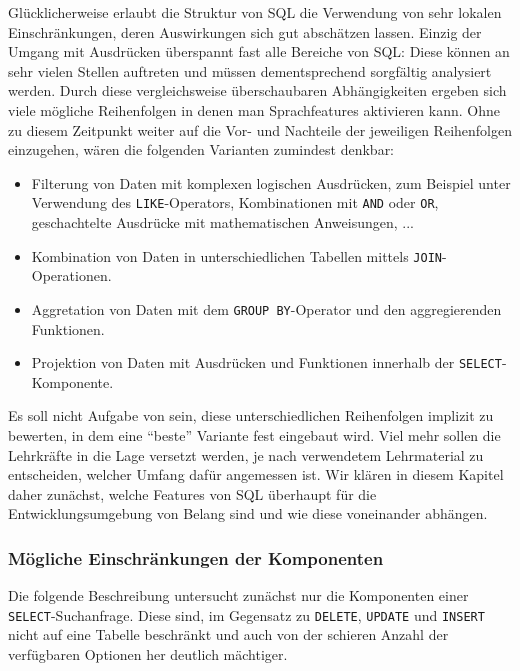 Glücklicherweise erlaubt die Struktur von SQL die Verwendung von sehr lokalen Einschränkungen, deren Auswirkungen sich gut abschätzen lassen. Einzig der Umgang mit Ausdrücken überspannt fast alle Bereiche von SQL: Diese können an sehr vielen Stellen auftreten und müssen dementsprechend sorgfältig analysiert werden. Durch diese vergleichsweise überschaubaren Abhängigkeiten ergeben sich viele mögliche Reihenfolgen in denen man Sprachfeatures aktivieren kann. Ohne zu diesem Zeitpunkt weiter auf die Vor- und Nachteile der jeweiligen Reihenfolgen einzugehen, wären die folgenden Varianten zumindest denkbar:

\begin{itemize}
  \item Filterung von Daten mit komplexen logischen Ausdrücken, zum Beispiel unter Verwendung des \texttt{LIKE}-Operators, Kombinationen mit \texttt{AND} oder \texttt{OR}, geschachtelte Ausdrücke mit mathematischen Anweisungen, ...
  \item Kombination von Daten in unterschiedlichen Tabellen mittels \texttt{JOIN}-Operationen.
  \item Aggretation von Daten mit dem \texttt{GROUP BY}-Operator und den aggregierenden Funktionen.
  \item Projektion von Daten mit Ausdrücken und Funktionen innerhalb der \texttt{SELECT}-Komponente.
\end{itemize}

Es soll nicht Aufgabe von \idename sein, diese unterschiedlichen Reihenfolgen implizit zu bewerten, in dem eine "`beste"' Variante fest eingebaut wird. Viel mehr sollen die Lehrkräfte in die Lage versetzt werden, je nach verwendetem Lehrmaterial zu entscheiden, welcher Umfang dafür angemessen ist. Wir klären in diesem Kapitel daher zunächst, welche Features von SQL überhaupt für die Entwicklungsumgebung von Belang sind und wie diese voneinander abhängen.

\subsubsection{Mögliche Einschränkungen der Komponenten}
\label{sec:sql-subset-local}

Die folgende Beschreibung untersucht zunächst nur die Komponenten einer \texttt{SELECT}-Suchanfrage. Diese sind, im Gegensatz zu \texttt{DELETE}, \texttt{UPDATE} und \texttt{INSERT} nicht auf eine Tabelle beschränkt und auch von der schieren Anzahl der verfügbaren Optionen her deutlich mächtiger.

